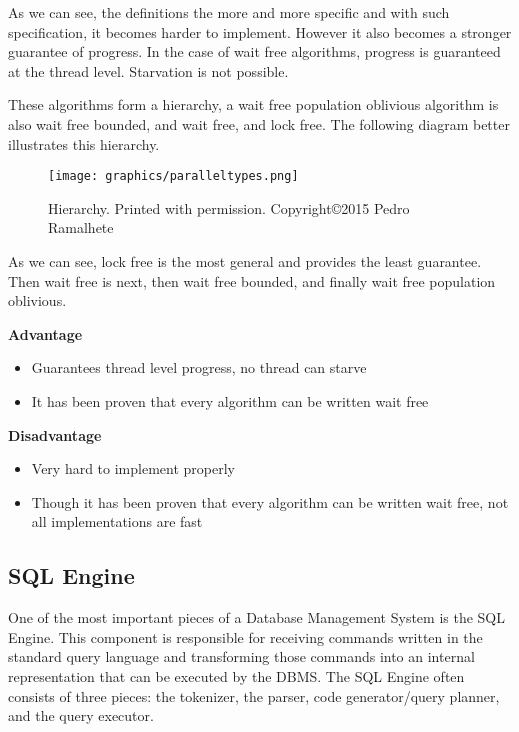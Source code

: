 \documentclass[letterpaper, 12pt]{article}
\begin{document}
\par\vspace{\baselineskip}

As we can see, the definitions the more and more specific and with such specification, it becomes 
harder to implement. However it also becomes a stronger guarantee of progress. In the case of 
wait free algorithms, progress is guaranteed at the thread level. Starvation is not possible.

These algorithms form a hierarchy, a wait free population oblivious algorithm is also wait 
free bounded, and wait free, and lock free. The following diagram better illustrates 
this hierarchy.

\begin{figure}
    \centering
	\texttt{[image: graphics/paralleltypes.png]}
	\caption{Hierarchy. Printed with permission. Copyright\copyright 2015 Pedro Ramalhete}
	\citep{concurrencyfreaks}
\end{figure}


As we can see, lock free is the most general and provides the least guarantee. Then 
wait free is next, then wait free bounded, and finally wait free population oblivious.


{\bfseries Advantage}
\par\vspace{\baselineskip}
\begin{itemize}

	\item Guarantees thread level progress, no thread can starve
	\item It has been proven that every algorithm can be written wait free
\end{itemize}


{\bfseries Disadvantage}
\par\vspace{\baselineskip}
\begin{itemize}

	\item Very hard to implement properly
	\item Though it has been proven that every algorithm can be written wait free, not all implementations are fast
\end{itemize}

\newpage
\subsection{SQL Engine}
One of the most important pieces of a Database Management System is the SQL Engine.
This component is responsible for receiving commands written in the standard query
language and transforming those commands into an internal representation that can be
executed by the DBMS. The SQL Engine often consists of three pieces: the tokenizer, the
parser, code generator/query planner, and the query executor.
\end{document}
